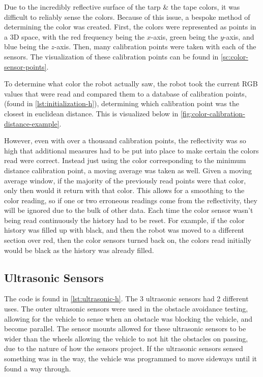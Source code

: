 \documentclass[11pt]{report}
\begin{document}
\par Due to the incredibly reflective surface of the tarp \& the tape colors, it was difficult to reliably sense the colors. Because of this issue, a bespoke method of determining the color was created. First, the colors were represented as points in a 3D space, with the red frequency being the $x$-axis, green being the $y$-axis, and blue being the $z$-axis. Then, many calibration points were taken with each of the sensors. The visualization of these calibration points can be found in \cref{sc:color-sensor-points}.

\par To determine what color the robot actually saw, the robot took the current RGB values that were read and compared them to a database of calibration points, (found in \cref{lst:initialization-h}), determining which calibration point was the closest in euclidean distance. This is visualized below in \cref{fig:color-calibration-distance-example}.

\par However, even with over a thousand calibration points, the reflectivity was so high that additional measures had to be put into place to make certain the colors read were correct. Instead just using the color corresponding to the minimum distance calibration point, a moving average was taken as well. Given a moving average window, if the majority of the previously read points were that color, only then would it return with that color. This allows for a smoothing to the color reading, so if one or two erroneous readings come from the reflectivity, they will be ignored due to the bulk of other data.  Each time the color sensor wasn't being read continuously the history had to be reset. For example, if the color history was filled up with black, and then the robot was moved to a different section over red, then the color sensors turned back on, the colors read initially would be black as the history was already filled.



\subsection{Ultrasonic Sensors}
The code is found in \cref{lst:ultrasonic-h}. The 3 ultrasonic sensors had 2 different uses. The outer ultrasonic sensors were used in the obstacle avoidance testing, allowing for the vehicle to sense when an obstacle was blocking the vehicle, and become parallel. The sensor mounts allowed for these ultrasonic sensors to be wider than the wheels allowing the vehicle to not hit the obstacles on passing, due to the nature of how the sensors project. If the ultrasonic sensors sensed something was in the way, the vehicle was programmed to move sideways until it found a way through. 
\end{document}
